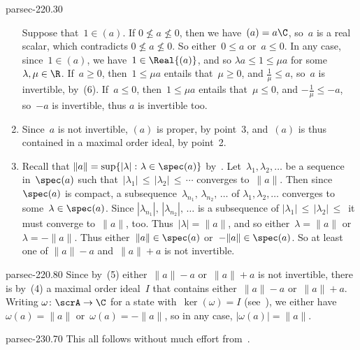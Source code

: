 \documentclass[b5page]{book}
\begin{document}
\begin{solution}{parsec-220.30}
\begin{enumerate}
Suppose that~$1\in(a)$.
If $0\nleq a\nleq 0$, then we have~$(a)=a\C$,
so~$a$ is a real scalar, which contradicts
$0\nleq a\nleq 0$.
So either~$0\leq a$ or~$a\leq 0$.
In any case,
since~$1\in (a)$,
we have~$1\in \Real{(a)}$,
and so $\lambda a\leq 1\leq \mu a$
for some~$\lambda,\mu\in \R$.
If~$a\geq 0$,
then~$1\leq \mu a$ entails that~$\mu\geq 0$, 
and
$\frac{1}{\mu}\leq a$,
so~$a$ is invertible, by~(6).
If~$a\leq 0$,
then~$1\leq \mu a$ entails that~$\mu\leq 0$,
and
$-\frac{1}{\mu} \leq -a$,
so~$-a$ is invertible,
thus $a$ is invertible too.
\item
Since~$a$ is not invertible,
$(a)$ is proper, by point~3,
and~$(a)$ is thus contained in a maximal order ideal, by point~2.
\item
Recall that $\|a\|=\sup\{\left|\lambda\right|\colon \lambda\in \spec(a)\}$
by~.
Let~$\lambda_1,\lambda_2,\dotsc$
be a sequence in~$\spec(a)$
such that~$\left|\lambda_1\right|\,\leq\,
\left|\lambda_2\right|\,\leq\,
\dotsb$ converges to~$\|a\|$.
Then since~$\spec(a)$ is compact,
a subsequence~$\lambda_{n_1},\,\lambda_{n_2},\,\dotsc$
of  $\lambda_1,\lambda_2,\dotsc$
converges to some~$\lambda\in\spec(a)$.
Since $\left|\lambda_{n_1}\right|,\,\left|\lambda_{n_2}\right|,\,\dotsc$
is a subsequence of 
$\left|\lambda_1\right|\,\leq\,
\left|\lambda_2\right|\,\leq\,$
it must converge to~$\|a\|$, too.
Thus~$\left|\lambda\right|=\|a\|$,
and so either~$\lambda=\|a\|$ or~$\lambda=-\|a\|$.
Thus either~$\|a\|\in \spec(a)$
or~$-\|a\|\in \spec(a)$.
So at least one of
$\|a\|-a$ and~$\|a\|+a$
is not invertible.
\end{enumerate}
\end{solution}
\begin{solution}{parsec-220.80}
Since by~(5)
either~$\|a\|-a$ or~$\|a\|+a$ is not invertible,
there is
by~(4)
a maximal order ideal~$I$
that contains either~$\|a\|-a$
or~$\|a\|+a$.
Writing $\omega\colon\scrA\to\C$
for a state
with~$\ker(\omega)=I$
(see~),
we either have~$\omega(a)=\|a\|$
or~$\omega(a)=-\|a\|$,
so in any case, $\left|\omega(a)\right|=\|a\|$.
\end{solution}
\begin{solution}{parsec-230.70}
This all follows without much effort from~.
\end{solution}
\end{document}
